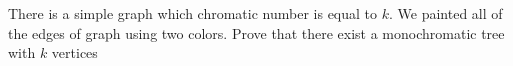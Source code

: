 There is a simple graph which chromatic number is equal to $k$. We painted all of the edges of graph using two colors. Prove that there exist a monochromatic tree with $k$ vertices